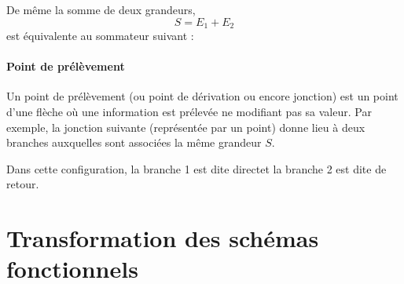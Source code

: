 De même la somme de deux grandeurs,
$$
S = E_1+E_2
$$
est équivalente au sommateur suivant :
\begin{center}
\end{center}

\paragraph{Point de prélèvement}

Un point de prélèvement (ou point de dérivation ou encore jonction) 
est un point d'une flèche où une information est prélevée ne modifiant pas 
sa valeur. Par exemple, la jonction suivante (représentée par un point) donne 
lieu à deux branches auxquelles sont associées la même grandeur $S$.

\begin{center}
\end{center}

Dans cette configuration, la branche 1 est dite \og direct\fg et la 
branche 2 est dite de \og retour\fg.

\section{Transformation des schémas fonctionnels}

